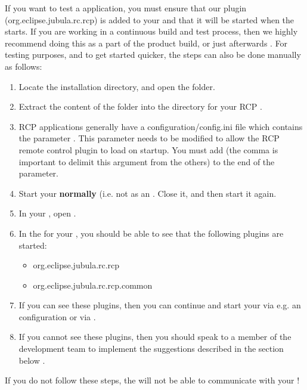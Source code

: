 
If you want to test a  application, you must ensure that our  plugin (org.eclipse.jubula.rc.rcp) is added to your \gdaut{} and that it will be started when the \gdaut{} starts. If you are working in a continuous build and test process, then we highly recommend doing this as a part of the product build, or just afterwards . For testing purposes, and to get started quicker, the steps can also be done manually as follows:


\begin{enumerate}
\item Locate the installation directory, and open the  folder.
\item Extract the content of the  folder into the  directory for your RCP \gdaut{}.
\item RCP applications generally have a configuration/config.ini file which contains the parameter . This parameter needs to be modified to allow the RCP remote control plugin to load on \gdaut{} startup. You must add   (the comma is important to delimit this argument from the others) to the end of the  parameter.
\item Start your \gdaut{} \textbf{normally} (i.e. not as an \gdaut{}. Close it, and then start it again. 
\item In your \gdaut{}, open . 
\item In the  for your \gdaut{}, you should be able to see that the following plugins are started:
\begin{itemize}
\item org.eclipse.jubula.rc.rcp
\item org.eclipse.jubula.rc.rcp.common
\end{itemize}
\item If you can see these plugins, then you can continue and start your \gdaut{} via e.g. an \gdaut{} configuration  or via  . 
\item If you cannot see these plugins, then you should speak to a member of the development team to implement the suggestions described in the section below .
\end{enumerate}
If you do not follow these steps, the \gdagent{} will not be able to communicate with your \gdaut{}!

